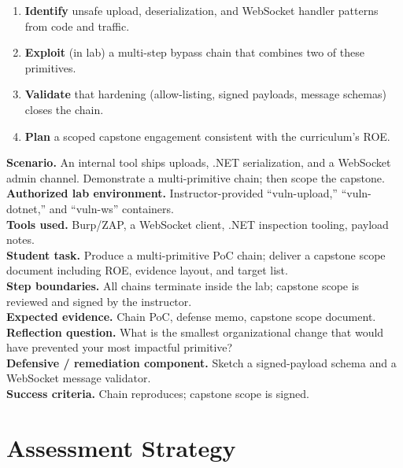 \documentclass[11pt,letterpaper,oneside]{report}
\begin{document}
\begin{outcomes}
\begin{enumerate}
  \item \textbf{Identify} unsafe upload, deserialization, and WebSocket handler patterns from code and traffic.
  \item \textbf{Exploit} (in lab) a multi-step bypass chain that combines two of these primitives.
  \item \textbf{Validate} that hardening (allow-listing, signed payloads, message schemas) closes the chain.
  \item \textbf{Plan} a scoped capstone engagement consistent with the curriculum's ROE.
\end{enumerate}
\end{outcomes}

\begin{labbox}
\textbf{Scenario.} An internal tool ships uploads, .NET serialization, and a WebSocket admin channel. Demonstrate a multi-primitive chain; then scope the capstone.\\[3pt]
\textbf{Authorized lab environment.} Instructor-provided ``vuln-upload,'' ``vuln-dotnet,'' and ``vuln-ws'' containers.\\[3pt]
\textbf{Tools used.} Burp/ZAP, a WebSocket client, .NET inspection tooling, payload notes.\\[3pt]
\textbf{Student task.} Produce a multi-primitive PoC chain; deliver a capstone scope document including ROE, evidence layout, and target list.\\[3pt]
\textbf{Step boundaries.} All chains terminate inside the lab; capstone scope is reviewed and signed by the instructor.\\[3pt]
\textbf{Expected evidence.} Chain PoC, defense memo, capstone scope document.\\[3pt]
\textbf{Reflection question.} What is the smallest organizational change that would have prevented your most impactful primitive?\\[3pt]
\textbf{Defensive / remediation component.} Sketch a signed-payload schema and a WebSocket message validator.\\[3pt]
\textbf{Success criteria.} Chain reproduces; capstone scope is signed.
\end{labbox}

\chapter*{Assessment Strategy}
\end{document}
